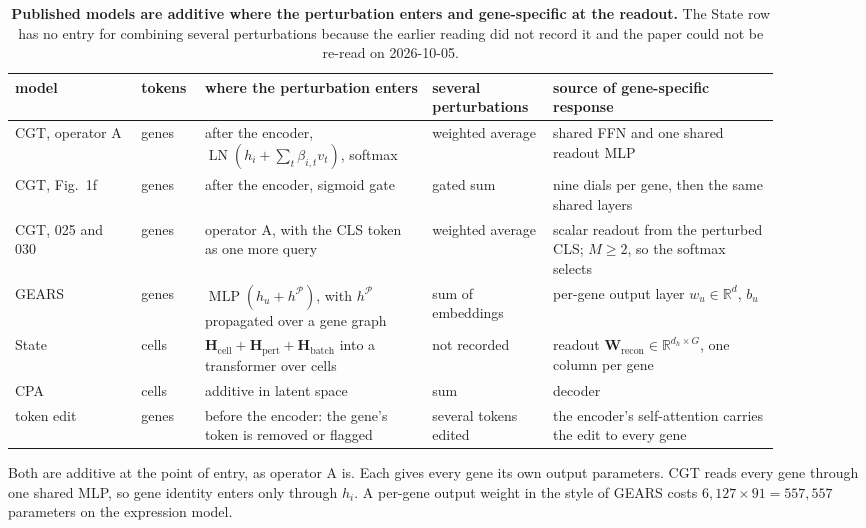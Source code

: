 \begin{table}[h]
\footnotesize
\caption[Where the perturbation enters, by model]{\textbf{Published models are additive
where the perturbation enters and gene-specific at the readout.} The State row has no
entry for combining several perturbations because the earlier reading did not record it and
the paper could not be re-read on 2026-10-05.
}
\label{tab:methods}
\begin{tabular}{@{}p{0.15\linewidth}p{0.06\linewidth}p{0.27\linewidth}p{0.14\linewidth}p{0.27\linewidth}@{}}
\toprule
model & tokens & where the perturbation enters & several perturbations & source of gene-specific response \\
\midrule
CGT, operator A & genes & after the encoder, $\operatorname{LN}(h_i+\sum_t\beta_{i,t}v_t)$, softmax & weighted average & shared FFN and one shared readout MLP \\
CGT, Fig.~1f & genes & after the encoder, sigmoid gate & gated sum & nine dials per gene, then the same shared layers \\
CGT, 025 and 030 & genes & operator A, with the CLS token as one more query & weighted average & scalar readout from the perturbed CLS; $M\ge 2$, so the softmax selects \\
GEARS & genes & $\operatorname{MLP}(h_u+h^{\mathcal P})$, with $h^{\mathcal P}$ propagated over a gene graph & sum of embeddings & per-gene output layer $w_u\in\mathbb{R}^d$, $b_u$ \\
State & cells & $\mathbf H_{\mathrm{cell}}+\mathbf H_{\mathrm{pert}}+\mathbf H_{\mathrm{batch}}$ into a transformer over cells & not recorded & readout $\mathbf W_{\mathrm{recon}}\in\mathbb{R}^{d_h\times G}$, one column per gene \\
CPA & cells & additive in latent space & sum & decoder \\
token edit & genes & before the encoder: the gene's token is removed or flagged & several tokens edited & the encoder's self-attention carries the edit to every gene \\
\bottomrule
\end{tabular}
\end{table}

 Both are additive at the
point of entry, as operator A is. Each gives every gene its own output parameters. CGT
reads every gene through one shared MLP, so gene identity enters only through $h_i$. A
per-gene output weight in the style of GEARS costs $6{,}127\times 91=557{,}557$ parameters
on the expression model.

